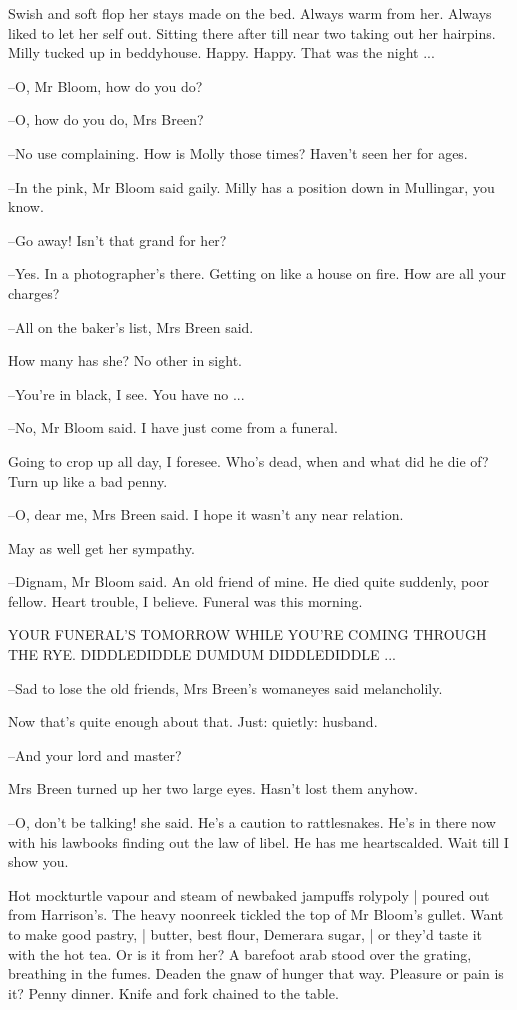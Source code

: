 Swish and soft flop her stays made on the bed.
Always warm from her.
Always liked to let her self out.
Sitting there after till near two taking out her hairpins.
Milly tucked up in beddyhouse.
Happy.
Happy.
That was the night ...

--O, Mr Bloom, how do you do?

--O, how do you do, Mrs Breen?

--No use complaining.
How is Molly those times?
Haven't seen her for ages.

--In the pink,
Mr Bloom said gaily.
Milly has a position down in Mullingar, you know.

--Go away!
Isn't that grand for her?

--Yes.
In a photographer's there.
Getting on like a house on fire.
How are all your charges?

--All on the baker's list,
Mrs Breen said.

How many has she?
No other in sight.

--You're in black, I see.
You have no ...

--No,
Mr Bloom said.
I have just come from a funeral.

Going to crop up all day, I foresee.
Who's dead,
when and what did he die of?
Turn up like a bad penny.

--O, dear me,
Mrs Breen said.
I hope it wasn't any near relation.

May as well get her sympathy.

--Dignam,
Mr Bloom said.
An old friend of mine.
He died quite suddenly,
poor fellow.
Heart trouble, I believe.
Funeral was this morning.


    YOUR FUNERAL'S TOMORROW
    WHILE YOU'RE COMING THROUGH THE RYE.
    DIDDLEDIDDLE DUMDUM
    DIDDLEDIDDLE ...


--Sad to lose the old friends,
Mrs Breen's womaneyes said melancholily.

Now that's quite enough about that.
Just:
quietly:
husband.

--And your lord and master?

Mrs Breen turned up her two large eyes.
Hasn't lost them anyhow.

--O, don't be talking!
she said.
He's a caution to rattlesnakes.
He's in there now with his lawbooks finding out the law of libel.
He has me heartscalded.
Wait till I show you.

Hot mockturtle vapour and steam of newbaked jampuffs rolypoly |
poured out from Harrison's.
The heavy noonreek tickled the top of Mr Bloom's gullet.
Want to make good pastry, |
butter, best flour, Demerara sugar, |
or they'd taste it with the hot tea.
Or is it from her?
A barefoot arab stood over the grating,
breathing in the fumes.
Deaden the gnaw of hunger that way.
Pleasure or pain is it?
Penny dinner.
Knife and fork
chained to the table.

